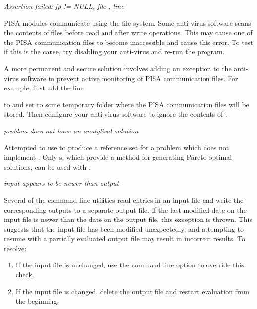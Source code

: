 \noindent
\textit{Assertion failed: fp != NULL, file , line }
\begin{indented}
  PISA modules communicate using the file system.  Some anti-virus software scans the contents of files before read and after write operations.  This may cause one of the PISA communication files to become inaccessible and cause this error.  To test if this is the cause, try disabling your anti-virus and re-run the program.
  
  A more permanent and secure solution involves adding an exception to the anti-virus software to prevent active monitoring of PISA communication files. For example, first add the line
  \begin{indented}
  \end{indented}
  to  and set  to some temporary folder where the PISA communication files will be stored.  Then configure your anti-virus software to ignore the contents of .
\end{indented}

\noindent
\textit{problem does not have an analytical solution}
\begin{indented}
  Attempted to use  to produce a reference set for a problem which does not implement .  Only s, which provide a method for generating Pareto optimal solutions, can be used with .
\end{indented}

\noindent
\textit{input appears to be newer than output}
\begin{indented}
  Several of the command line utilities read entries in an input file and write the corresponding outputs to a separate output file.  If the last modified date on the input file is newer than the date on the output file, this exception is thrown.  This suggests that the input file has been modified unexpectedly, and attempting to resume with a partially evaluated output file may result in incorrect results.  To resolve:
  \begin{enumerate}
    \item If the input file is unchanged, use the  command line option to override this check.
    \item If the input file is changed, delete the output file and restart evaluation from the beginning.
  \end{enumerate}
\end{indented}


